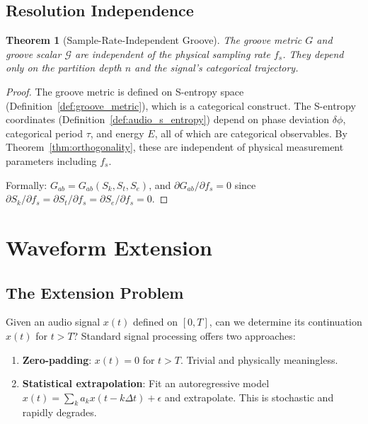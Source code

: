 \documentclass[twocolumn,10pt]{article}
\newtheorem{theorem}{Theorem}[section]
\theoremstyle{remark}
\newcommand{\Sk}{S_k}
\newcommand{\St}{S_t}
\newcommand{\Se}{S_e}
\newcommand{\calG}{\mathcal{G}}
\begin{document}
\subsection{Resolution Independence}

\begin{theorem}[Sample-Rate-Independent Groove]
\label{thm:groove_resolution}
The groove metric $G$ and groove scalar $\calG$ are independent of the physical sampling rate $f_s$. They depend only on the partition depth $n$ and the signal's categorical trajectory.
\end{theorem}

\begin{proof}
The groove metric is defined on S-entropy space (Definition~\ref{def:groove_metric}), which is a categorical construct. The S-entropy coordinates (Definition~\ref{def:audio_s_entropy}) depend on phase deviation $\delta\phi$, categorical period $\tau$, and energy $E$, all of which are categorical observables. By Theorem~\ref{thm:orthogonality}, these are independent of physical measurement parameters including $f_s$.

Formally: $G_{ab} = G_{ab}(\Sk, \St, \Se)$, and $\partial G_{ab}/\partial f_s = 0$ since $\partial \Sk/\partial f_s = \partial \St/\partial f_s = \partial \Se/\partial f_s = 0$.
\end{proof}


\section{Waveform Extension}
\label{sec:extension}

\subsection{The Extension Problem}

Given an audio signal $x(t)$ defined on $[0, T]$, can we determine its continuation $x(t)$ for $t > T$? Standard signal processing offers two approaches:

\begin{enumerate}
    \item \textbf{Zero-padding}: $x(t) = 0$ for $t > T$. Trivial and physically meaningless.
    \item \textbf{Statistical extrapolation}: Fit an autoregressive model $x(t) = \sum_k a_k x(t - k\Delta t) + \epsilon$ and extrapolate. This is stochastic and rapidly degrades.
\end{enumerate}
\end{document}
